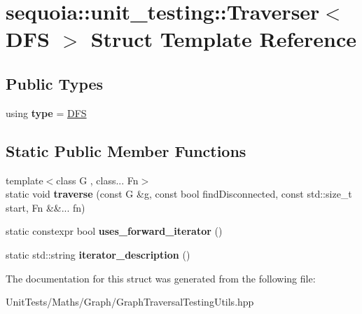 \hypertarget{structsequoia_1_1unit__testing_1_1_traverser_3_01_d_f_s_01_4}{}\section{sequoia\+::unit\+\_\+testing\+::Traverser$<$ D\+FS $>$ Struct Template Reference}
\label{structsequoia_1_1unit__testing_1_1_traverser_3_01_d_f_s_01_4}
\subsection*{Public Types}
\begin{DoxyCompactItemize}
\item 
\mbox{\label{structsequoia_1_1unit__testing_1_1_traverser_3_01_d_f_s_01_4_a4ae6c3041c7f50381ad26864dea3c8c8}} 
using {\bfseries type} = \mbox{\hyperlink{structsequoia_1_1unit__testing_1_1_d_f_s}{D\+FS}}
\end{DoxyCompactItemize}
\subsection*{Static Public Member Functions}
\begin{DoxyCompactItemize}
\item 
\mbox{\label{structsequoia_1_1unit__testing_1_1_traverser_3_01_d_f_s_01_4_a8fb18a8ccb5c754690d104a7c1e6a06e}} 
{\footnotesize template$<$class G , class... Fn$>$ }\\static void {\bfseries traverse} (const G \&g, const bool find\+Disconnected, const std\+::size\+\_\+t start, Fn \&\&... fn)
\item 
\mbox{\label{structsequoia_1_1unit__testing_1_1_traverser_3_01_d_f_s_01_4_afae0f040c43ebbcbf80ed237af81796d}} 
static constexpr bool {\bfseries uses\+\_\+forward\+\_\+iterator} ()
\item 
\mbox{\label{structsequoia_1_1unit__testing_1_1_traverser_3_01_d_f_s_01_4_a998af7c2e1cab5482ad05b398ff2d2b3}} 
static std\+::string {\bfseries iterator\+\_\+description} ()
\end{DoxyCompactItemize}


The documentation for this struct was generated from the following file\+:\begin{DoxyCompactItemize}
\item 
Unit\+Tests/\+Maths/\+Graph/Graph\+Traversal\+Testing\+Utils.\+hpp\end{DoxyCompactItemize}
